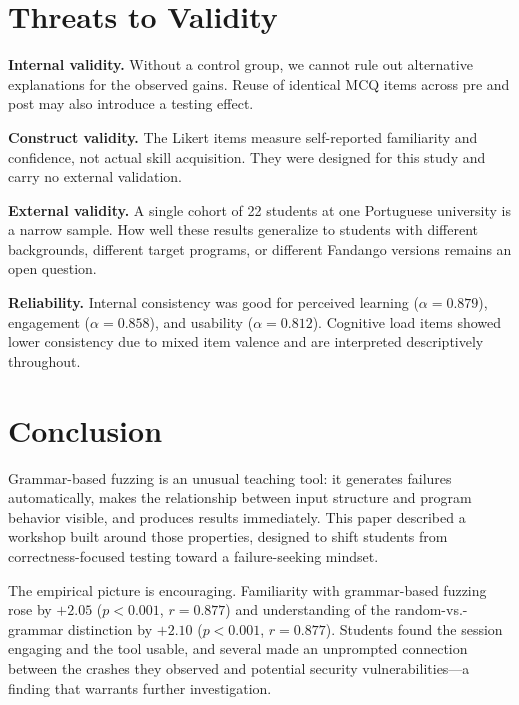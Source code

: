 \documentclass[conference]{IEEEtran}
\begin{document}
\section{Threats to Validity}
\label{sec:threats}

\textbf{Internal validity.}
Without a control group, we cannot rule out alternative explanations for the observed gains.
Reuse of identical MCQ items across pre and post may also introduce a testing effect.

\textbf{Construct validity.}
The Likert items measure self-reported familiarity and confidence, not actual skill acquisition.
They were designed for this study and carry no external validation.

\textbf{External validity.}
A single cohort of 22 students at one Portuguese university is a narrow sample.
How well these results generalize to students with different backgrounds, different target programs, or different Fandango versions remains an open question.

\textbf{Reliability.}
Internal consistency was good for perceived learning ($\alpha = 0.879$), engagement ($\alpha = 0.858$), and usability ($\alpha = 0.812$).
Cognitive load items showed lower consistency due to mixed item valence and are interpreted descriptively throughout.

\section{Conclusion}
\label{sec:conclusion}

Grammar-based fuzzing is an unusual teaching tool: it generates failures automatically, makes the relationship between input structure and program behavior visible, and produces results immediately.
This paper described a workshop built around those properties, designed to shift students from correctness-focused testing toward a failure-seeking mindset.

The empirical picture is encouraging.
Familiarity with grammar-based fuzzing rose by $+2.05$ ($p < 0.001$, $r = 0.877$) and understanding of the random-vs.-grammar distinction by $+2.10$ ($p < 0.001$, $r = 0.877$).
Students found the session engaging and the tool usable, and several made an unprompted connection between the crashes they observed and potential security vulnerabilities---a finding that warrants further investigation.
\end{document}
